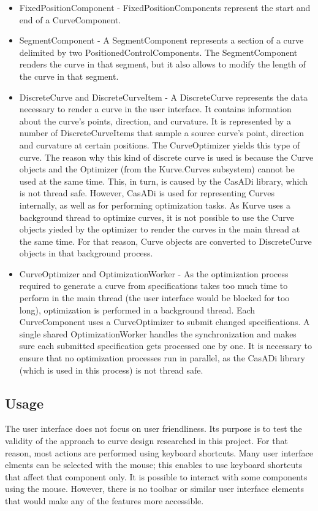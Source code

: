 \documentclass[a4paper]{article}
\begin{document}
\begin{itemize}
					\item FixedPositionComponent - FixedPositionComponents represent the start and end of a CurveComponent.
					\item SegmentComponent - A SegmentComponent represents a section of a curve delimited by two PositionedControlComponents. The SegmentComponent renders the curve in that segment, but it also allows to modify the length of the curve in that segment.
					\item DiscreteCurve and DiscreteCurveItem - A DiscreteCurve represents the data necessary to render a curve in the user interface. It contains information about the curve's points, direction, and curvature. It is represented by a number of DiscreteCurveItems that sample a source curve's point, direction and curvature at certain positions. 
					The CurveOptimizer yields this type of curve. The reason why this kind of discrete curve is used is because the Curve objects and the Optimizer (from the Kurve.Curves subsystem) cannot be used at the same time. This, in turn, is caused by the CasADi library, which is not thread safe. However, CasADi is used for representing Curves internally, as well as for performing optimization tasks.
					As Kurve uses a background thread to optimize curves, it is not possible to use the Curve objects yieded by the optimizer to render the curves in the main thread at the same time. For that reason, Curve objects are converted to DiscreteCurve objects in that background process.
					\item CurveOptimizer and OptimizationWorker - As the optimization process required to generate a curve from specifications takes too much time to perform in the main thread (the user interface would be blocked for too long), optimization is performed in a background thread. Each CurveComponent uses a CurveOptimizer to submit changed specifications. A single shared OptimizationWorker handles the synchronization and makes sure each submitted specification gets processed one by one. It is necessary to ensure that no optimization processes run in parallel, as the CasADi library (which is used in this process) is not thread safe.
				\end{itemize}

			\subsection{Usage}
				
				The user interface does not focus on user friendliness. Its purpose is to test the validity of the approach to curve design researched in this project. For that reason, most actions are performed using keyboard shortcuts. Many user interface elments can be selected with the mouse; this enables to use keyboard shortcuts that affect that component only. It is possible to interact with some components using the mouse. However, there is no toolbar or similar user interface elements that would make any of the features more accessible.
				
\end{document}
